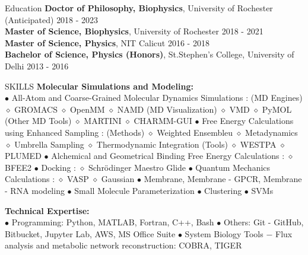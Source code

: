 \documentclass{resume} %
\begin{document}

\begin{rSection}{Education}
    {\bf Doctor of Philosophy, Biophysics}, University of Rochester (Anticipated) \hfill {2018 - 2023}\\
    {\bf Master of Science, Biophysics}, University of Rochester \hfill {2018 - 2021}\\
    {\bf Master of Science, Physics}, NIT Calicut \hfill {2016 - 2018}\\
    {\bf Bachelor of Science, Physics (Honors)}, St.Stephen's College, University of Delhi \hfill {2013 - 2016}


\end{rSection}


\begin{rSection}{SKILLS}
        {\bf Molecular Simulations and Modeling:} \\
        $\bullet$ All-Atom and Coarse-Grained Molecular Dynamics Simulations : 
        (MD Engines)   \textsf{$\diamond$ GROMACS $\diamond$ OpenMM $\diamond$ NAMD}
        (MD Visualization)  \textsf{$\diamond$ VMD $\diamond$ PyMOL}
        (Other MD Tools) \textsf{$\diamond$ MARTINI $\diamond$ CHARMM-GUI}
        $\bullet$ Free Energy Calculations using Enhanced Sampling :
        (Methods) $\diamond$ Weighted Ensembleu $\diamond$ Metadynamics $\diamond$ Umbrella Sampling $\diamond$ Thermodynamic Integration
        (Tools) \textsf{$\diamond$ WESTPA $\diamond$ PLUMED}
        $\bullet$ Alchemical and Geometrical Binding Free Energy Calculations :
        $\diamond$ \textsf{BFEE2}
        $\bullet$ Docking : 
        $\diamond$ \textsf{Schrödinger Maestro Glide}
        $\bullet$ Quantum Mechanics Calculations : 
        \textsf{$\diamond$ VASP $\diamond$ Gaussian}
        $\bullet$ Membrane, Membrane - GPCR, Membrane - RNA modeling $\bullet$ Small Molecule Parameterization  $\bullet$ Clustering $\bullet$ SVMs

        {\bf Technical Expertise:} \\
        $\bullet$ Programming: \textsf{Python, MATLAB, Fortran, C++, Bash} $\bullet$
        Others: \textsf{Git - GitHub, Bitbucket, Jupyter Lab, AWS, MS Office Suite} $\bullet$
        System Biology Tools $-$  Flux analysis and metabolic network reconstruction: \textsf{COBRA, TIGER}

\end{rSection}
\end{document}
